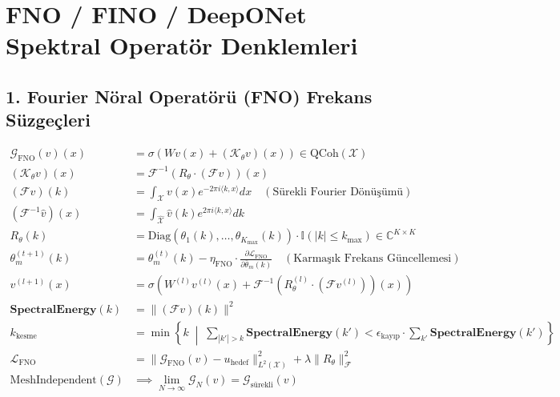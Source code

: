 \documentclass[11pt, a4paper]{article}
\begin{document}
\section{FNO / FINO / DeepONet Spektral Operatör Denklemleri}

\subsection{1. Fourier Nöral Operatörü (FNO) Frekans Süzgeçleri}
\begin{align}
\mathcal{G}_{\text{FNO}}(v)(x) &= \sigma\left( W v(x) + (\mathcal{K}_\theta v)(x) \right) \in \text{QCoh}(\mathcal{X}) \\
(\mathcal{K}_\theta v)(x) &= \mathcal{F}^{-1} \left( R_\theta \cdot (\mathcal{F} v) \right)(x) \\
(\mathcal{F} v)(k) &= \int_{\mathcal{X}} v(x) e^{-2\pi i \langle k, x \rangle} dx \quad (\text{Sürekli Fourier Dönüşümü}) \\
(\mathcal{F}^{-1} \hat{v})(x) &= \int_{\hat{\mathcal{X}}} \hat{v}(k) e^{2\pi i \langle k, x \rangle} dk \\
R_\theta(k) &= \text{Diag}(\theta_1(k), \dots, \theta_{K_{\max}}(k)) \cdot \mathbb{I}(|k| \le k_{\text{max}}) \in \mathbb{C}^{K \times K} \\
\theta_m^{(t+1)}(k) &= \theta_m^{(t)}(k) - \eta_{\text{FNO}} \cdot \frac{\partial \mathcal{L}_{\text{FNO}}}{\partial \bar{\theta}_m(k)} \quad (\text{Karmaşık Frekans Güncellemesi}) \\
v^{(l+1)}(x) &= \sigma\left( W^{(l)} v^{(l)}(x) + \mathcal{F}^{-1} \left( R_\theta^{(l)} \cdot (\mathcal{F} v^{(l)}) \right)(x) \right) \\
\mathbf{SpectralEnergy}(k) &= \| (\mathcal{F} v)(k) \|^2 \\
k_{\text{kesme}} &= \min \left\{ k \;\middle|\; \sum_{|k'|>k} \mathbf{SpectralEnergy}(k') < \epsilon_{\text{kayıp}} \cdot \sum_{k'} \mathbf{SpectralEnergy}(k') \right\} \\
\mathcal{L}_{\text{FNO}} &= \| \mathcal{G}_{\text{FNO}}(v) - u_{\text{hedef}} \|_{L^2(\mathcal{X})}^2 + \lambda \| R_\theta \|_{\mathcal{F}}^2 \\
\text{MeshIndependent}(\mathcal{G}) &\implies \lim_{N \to \infty} \mathcal{G}_N(v) = \mathcal{G}_{\text{sürekli}}(v)
\end{align}
\end{document}
